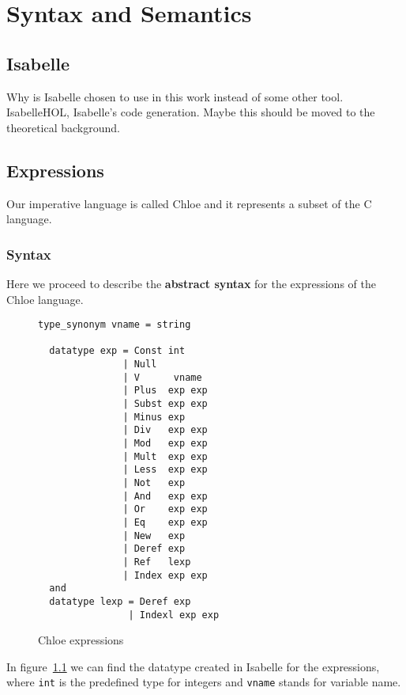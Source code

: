 \chapter{Syntax and Semantics}\label{chapter:semantics}

\section{Isabelle}\label{section:isabelle}

Why is Isabelle chosen to use in this work instead of some other tool.
IsabelleHOL, Isabelle's code generation.
Maybe this should be moved to the theoretical background.

\section{Expressions}\label{section:expressions}

Our imperative language is called Chloe and it represents a subset of the C language.

\subsection{Syntax}\label{subsection:syntax_expressions}

Here we proceed to describe the \textbf{abstract syntax} for the expressions of the Chloe language.

\begin{figure}
  \caption{Chloe expressions}
  \label{fig:chloe_expressions}

  \begin{lstlisting}[frame=single]
  type_synonym vname = string

  datatype exp = Const int
               | Null
               | V      vname
               | Plus  exp exp
               | Subst exp exp
               | Minus exp
               | Div   exp exp
               | Mod   exp exp
               | Mult  exp exp
               | Less  exp exp
               | Not   exp
               | And   exp exp
               | Or    exp exp
               | Eq    exp exp
               | New   exp
               | Deref exp
               | Ref   lexp
               | Index exp exp
  and
  datatype lexp = Deref exp
                | Indexl exp exp
  \end{lstlisting}
\end{figure}

In figure~\ref{fig:chloe_expressions} we can find the datatype created in Isabelle for the expressions, where \verb|int| is the predefined type for integers and \verb|vname| stands for variable name.

